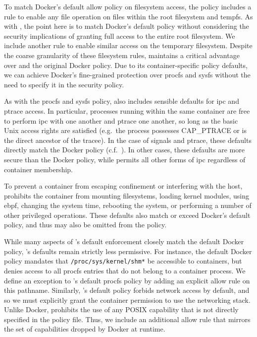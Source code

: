 To match Docker's default allow policy on filesystem access, the \bpfcontain{} policy
includes a rule to enable any file operation on files within the root filesystem and
tempfs.  As with \bpfbox{}, the point here is to match Docker's default policy without
considering the security implications of granting full access to the entire root
filesystem. We include another rule to enable similar access on the temporary filesystem.
Despite the coarse granularity of these filesystem rules, \bpfcontain{} maintains
a critical advantage over \bpfbox{} and the original Docker policy. Due to its
container-specific policy defaults, we can achieve Docker's fine-grained protection over
procfs and sysfs without the need to specify it in the security policy.

As with the procfs and sysfs policy, \bpfcontain{} also includes sensible defaults for
\gls{ipc} and ptrace access. In particular, processes running within the same container
are free to perform \gls{ipc} with one another and ptrace one another, so long as the
basic Unix access rights are satisfied (e.g.\ the process possesses CAP\_PTRACE or is the
direct ancestor of the tracee). In the case of signals and ptrace, these defaults directly
match the Docker policy (c.f.\ ).  In other cases, these defaults
are more secure than the Docker policy, while permits all other forms of \gls{ipc}
regardless of container membership.

To prevent a container from escaping confinement or interfering with the host,
\bpfcontain{} prohibits the container from mounting filesystems, loading kernel modules,
using \gls{ebpf}, changing the system time, rebooting the system, or performing a number
of other privileged operations. These defaults also match or exceed Docker's default
policy, and thus may also be omitted from the \bpfcontain{} policy.

While many aspects of \bpfcontain{}'s default enforcement closely match the default Docker
policy, \bpfcontain{}'s defaults remain strictly less permissive. For instance, the
default Docker policy mandates that \texttt{/proc/sys/kernel/shm*} be accessible to
containers, but \bpfcontain{} denies access to all procfs entries that do not belong to
a container process. We define an exception to \bpfcontain{}'s default procfs policy by
adding an explicit allow rule on this pathname. Similarly, \bpfcontain{}'s default policy
forbids network access by default, and so we must explicitly grant the container
permission to use the networking stack. Unlike Docker, \bpfcontain{} prohibits the use of
any POSIX capability that is not directly specified in the policy file. Thus, we include
an additional allow rule that mirrors the set of capabilities dropped by Docker at
runtime.

